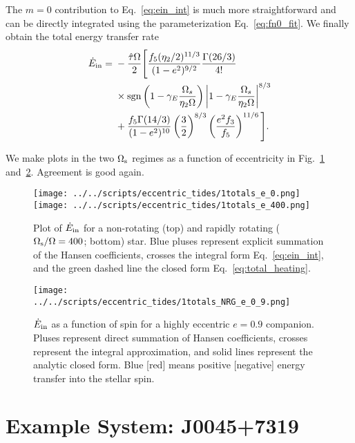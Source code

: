 \documentclass[
        fleqn,
        usenatbib,
    ]{mnras}
\newcommand*{\p}[1]{\left(#1\right)}
\begin{document}
The $m = 0$ contribution to Eq.~\eqref{eq:ein_int} is much more straightforward
and can be directly integrated using the parameterization
Eq.~\eqref{eq:fn0_fit}. We finally obtain the total energy transfer rate
\begin{align}
    \dot{E}_{\rm in} ={}& -\frac{\hat{\tau} \Omega}{2}\Bigg[\frac{f_5
        (\eta_2/2)^{11/3}}{(1-e^2)^{9/2}} \frac{\Gamma(26/3)}{4!}\nonumber\\
        &\times \mathrm{sgn}\p{1 - \gamma_E\frac{\Omega_s}{\eta_2 \Omega}}
            \left|1 - \gamma_E\frac{\Omega_s}{\eta_2 \Omega}\right|^{8/3}
            \nonumber\\
        &+
    \frac{f_5 \Gamma(14 / 3)}{(1 - e^2)^{10}} \left(\frac{3}{2}\right)^{8/3}
            \left(\frac{e^2 f_3}{f_5}\right)^{11/6}\Bigg].
            \label{eq:total_heating}
\end{align}

We make plots in the two $\Omega_{\rm s}$ regimes as a function of eccentricity in
Fig.~\ref{fig:e0} and~\ref{fig:e_spin}. Agreement is good again.
\begin{figure}
    \centering
    \texttt{[image: ../../scripts/eccentric\_tides/1totals\_e\_0.png]}
    \texttt{[image: ../../scripts/eccentric\_tides/1totals\_e\_400.png]}
    \caption{Plot of $\dot{E}_{\rm in}$ for a non-rotating (top) and rapidly
    rotating ($\Omega_{\rm s} / \Omega = 400$; bottom) star. Blue pluses
    represent explicit summation of the Hansen coefficients, crosses the
    integral form Eq.~\eqref{eq:ein_int}, and the green dashed line the closed
    form Eq.~\eqref{eq:total_heating}.}\label{fig:e0}
\end{figure}
\begin{figure}
    \centering
    \texttt{[image: ../../scripts/eccentric\_tides/1totals\_NRG\_e\_0\_9.png]}
    \caption{$\dot{E}_{\rm in}$ as a function of spin for a highly eccentric $e
    = 0.9$ companion. Pluses represent direct summation of Hansen coefficients,
    crosses represent the integral approximation, and solid lines represent
    the analytic closed form. Blue [red] means positive [negative]
    energy transfer into the stellar spin.}\label{fig:e_spin}
\end{figure}

\section{Example System: J0045+7319}\label{s:j00457319}
\end{document}
